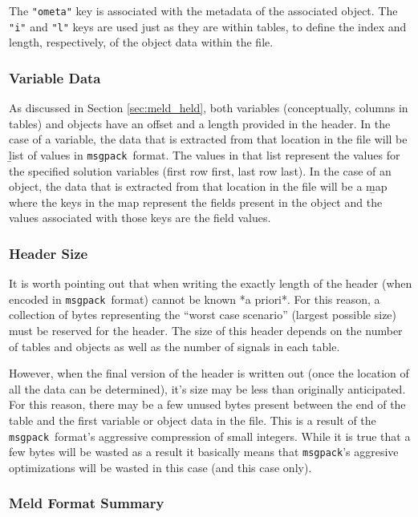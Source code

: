\documentclass[11pt,a4paper,onecolumn]{article}
\newcommand{\msgpack}{\texttt{msgpack}}
\newcommand{\code}[1]{\texttt{#1}} %
\begin{document}
The \code{"ometa"} key is associated with the metadata of the
associated object.  The \code{"i"} and \code{"l"} keys are used just
as they are within tables, to define the index and length,
respectively, of the object data within the file.

\subsubsection{Variable Data}

As discussed in Section \ref{sec:meld_held}, both variables
(conceptually, columns in tables) and objects have an offset and a
length provided in the header.  In the case of a variable, the data
that is extracted from that location in the file will be {\b list} of
values in \msgpack\ format.  The values in that list represent the
values for the specified solution variables (first row first, last row
last).  In the case of an object, the data that is extracted from that
location in the file will be a {\b map} where the keys in the map
represent the fields present in the object and the values associated
with those keys are the field values.

\subsubsection{Header Size}


It is worth pointing out that when writing the exactly length of the
header (when encoded in \msgpack\ format) cannot be known *a priori*.
For this reason, a collection of bytes representing the ``worst case
scenario'' (largest possible size) must be reserved for the header.
The size of this header depends on the number of tables and objects as
well as the number of signals in each table.

However, when the final version of the header is written out (once the
location of all the data can be determined), it's size may be less
than originally anticipated.  For this reason, there may be a few
unused bytes present between the end of the table and the first
variable or object data in the file.  This is a result of the
\msgpack\ format's aggressive compression of small integers.  While it
is true that a few bytes will be wasted as a result it basically means
that \msgpack's aggresive optimizations will be wasted in this case
(and this case only).

\subsubsection{Meld Format Summary}
\end{document}
